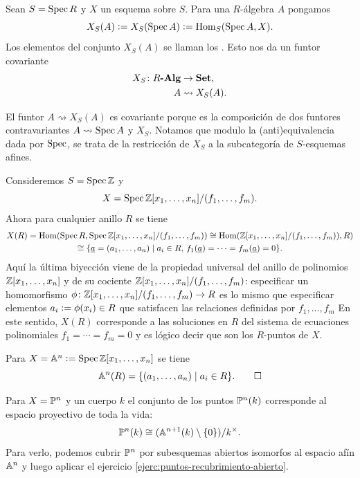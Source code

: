 \documentclass{article}
\numberwithin{equation}{section}
\theoremstyle{definition}
\begin{document}
\begin{definicion}
  Sean $S = \Spec R$ y $X$ un esquema sobre $S$. Para una $R$-álgebra $A$
  pongamos
  $$X_S (A) \dfn X_S (\Spec A) \dfn \Hom_S (\Spec A, X).$$
  Los elementos del conjunto $X_S (A)$ se llaman los
  . Esto nos da un funtor covariante
  \begin{align*}
    X_S\colon R\categ{-Alg} & \to \categ{Set},\\
    A & \rightsquigarrow X_S (A).
  \end{align*}
\end{definicion}

El funtor $A \rightsquigarrow X_S (A)$ es covariante porque es la composición
de dos funtores contravariantes $A \rightsquigarrow \Spec A$ y $X_S$. Notamos
que modulo la (anti)equivalencia dada por $\Spec$, se trata de la restricción
de $X_S$ a la subcategoría de $S$-esquemas afines.

\begin{ejemplo}
  Consideremos $S = \Spec \ZZ$ y
  $$X = \Spec \ZZ [x_1,\ldots,x_n]/(f_1,\ldots,f_m).$$
  Ahora para cualquier anillo $R$ se tiene
  \begin{multline*}
    X (R) = \Hom (\Spec R, \Spec \ZZ [x_1,\ldots,x_n]/(f_1,\ldots,f_m)) \isom
    \Hom (\ZZ [x_1,\ldots,x_n]/(f_1,\ldots,f_m)), R) \\
    \isom \{ \underline{a} = (a_1,\ldots,a_n) \mid a_i \in R, \, f_1 (\underline{a}) = \cdots = f_m (\underline{a}) = 0 \}.
  \end{multline*}
  Aquí la última biyección viene de la propiedad universal del anillo
  de polinomios $\ZZ [x_1,\ldots,x_n]$ y de su cociente
  $\ZZ [x_1,\ldots,x_n]/(f_1,\ldots,f_m)$: especificar un homomorfismo
  $\phi\colon \ZZ [x_1,\ldots,x_n]/(f_1,\ldots,f_m) \to R$ es lo mismo
  que especificar elementos $a_i \dfn \phi (x_i) \in R$ que satisfacen
  las relaciones definidas por $f_1,\ldots,f_m$ En este sentido, $X (R)$
  corresponde a las soluciones en $R$ del sistema de ecuaciones polinomiales
  $f_1 = \cdots = f_m = 0$ y es lógico decir que son los $R$-puntos de $X$.
\end{ejemplo}

\begin{ejemplo}
  Para $X = \AA^n \dfn \Spec \ZZ [x_1,\ldots,x_n]$ se tiene
  \[ \AA^n (R) = \{ (a_1,\ldots,a_n) \mid a_i \in R \}. \qedhere \]
\end{ejemplo}

\begin{ejemplo}
  Para $X = \PP^n$ y un cuerpo $k$ el conjunto de los puntos $\PP^n (k)$
  corresponde al espacio proyectivo de toda la vida:
  $$\PP^n (k) \isom (\AA^{n+1} (k)\setminus \{ 0 \})/k^\times.$$
  Para verlo, podemos cubrir $\PP^n$ por subesquemas abiertos isomorfos
  al espacio afín $\AA^n$ y luego aplicar el ejercicio
  \ref{ejerc:puntos-recubrimiento-abierto}.
\end{ejemplo}
\end{document}
